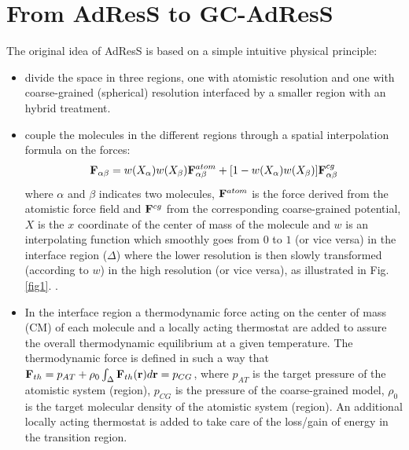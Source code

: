\documentclass[a4paper,preprint,unsortedaddress]{revtex4-1}
\begin{document}
\section{From AdResS to GC-AdResS}
The original idea of AdResS is based on a simple intuitive physical principle:
\begin{itemize}
\item divide the space in three regions, one with atomistic resolution and one with coarse-grained (spherical) resolution interfaced by a smaller region with an hybrid treatment.
\item couple the molecules in the different regions through a spatial interpolation formula on the forces:
\begin{equation}
{\bf F}_{\alpha \beta}=w(X_\alpha)w(X_\beta){\bf
  F}_{\alpha\beta}^{atom}+[1-w(X_\alpha)w(X_\beta)]{\bf F}^{cg}_{\alpha\beta} 
\label{eqforce}
\end{equation}
where $\alpha$ and $\beta$ indicates two molecules, ${\bf F}^{atom}$ is the
force derived from the atomistic force field and  ${\bf F}^{cg}$
from the corresponding coarse-grained potential, $X$ is the $x$ coordinate of the center of mass of
the molecule and $w$ is an interpolating function which smoothly goes from $0$
to $1$ (or vice versa) in the interface region ($\Delta$) where the lower resolution is then
slowly transformed (according to $w$) in the high resolution (or vice versa),
as illustrated in Fig.\ref{fig1}. .  
\item In the interface region a thermodynamic force acting on the center of mass (CM) of each molecule and a locally acting thermostat are added to assure the overall thermodynamic equilibrium at a given temperature. The thermodynamic force is defined in such a way that ${\bf F}_{th}=p_{AT}+\rho_{0}\int_{\Delta}{\bf F}_{th}({\bf r})d{\bf r}=p_{CG}$, where $p_{AT}$  is the target pressure of the atomistic system (region), $p_{CG}$ is the pressure of the coarse-grained model, $\rho_{0}$ is the target molecular density of the atomistic system (region)\cite{prl12}. An additional locally acting thermostat is added to take care of the loss/gain of energy in the transition region.
\end{itemize}
\end{document}
